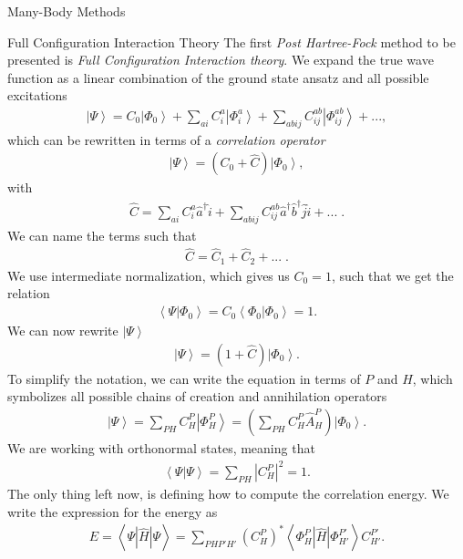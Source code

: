 \documentclass[twoside,english]{uiofysmaster}
\begin{document}
\begin{chapter}{Many-Body Methods}
	\begin{section}{Full Configuration Interaction Theory}
		The first \textit{Post Hartree-Fock} method to be presented is  \textit{Full Configuration Interaction theory}. We expand the true wave function as a linear combination of the ground state ansatz and all possible excitations
		\begin{align}
			\left| \Psi \right> = C_0 \left| \Phi_0 \right> + \sum_{ai} C_i^a \left| \Phi_i^a \right> + \sum_{abij} C_{ij}^{ab} \left| \Phi_{ij}^{ab} \right> + ... ,
		\end{align}
		which can be rewritten in terms of a \textit{correlation operator}
		\begin{align}
			\left| \Psi \right> = ( C_0 + \hat C) \left| \Phi_0 \right>,
		\end{align}
		with
		\begin{align}
			\hat C = \sum_{ai} C_i^a \hat a^\dagger \hat i + \sum_{abij} C_{ij}^{ab} \hat a^\dagger \hat b^\dagger \hat j \hat i + ... \; .
		\end{align}
		We can name the terms such that
		\begin{align}
			\hat C = \hat C_1 + \hat C_2 + ... \; .
		\end{align}
		We use intermediate normalization, which gives us $C_0 = 1$, such that we get the relation
		\begin{align}
			\left< \Psi | \Phi_0 \right> = C_0 \left< \Phi_0 | \Phi_0 \right> = 1.
		\end{align}
		We can now rewrite $\left| \Psi \right>$
		\begin{align}
			\left| \Psi \right> = (1 + \hat C) \left| \Phi_0 \right> .
			\label{equation:FCI}
		\end{align}
		To simplify the notation, we can write the equation in terms of $P$ and $H$, which symbolizes all possible chains of creation and annihilation operators
		\begin{align}
			\left| \Psi \right> = \sum_{PH} C_H^P \left| \Phi_H^P \right> = \left( \sum_{PH} C_H^P \hat A_H^P \right) \left| \Phi_0 \right>  .
		\end{align}
		We are working with orthonormal states, meaning that 
		\begin{align}
			\left< \Psi | \Psi \right> = \sum_{PH} \left| C_H^P \right|^2 = 1.
		\end{align}
		The only thing left now, is defining how to compute the correlation energy. We write the expression for the energy as
		\begin{align}
			E = \left< \right. \Psi | \hat H | \Psi \left. \right> = \sum_{PHP'H'} (C^P_H)^* \left< \right. \Phi_H^P | \hat H | \Phi_{H'}^{P'} \left. \right> C_{H'}^{P'} .
		\end{align} 
		

\end{section}
\end{chapter}
\end{document}
